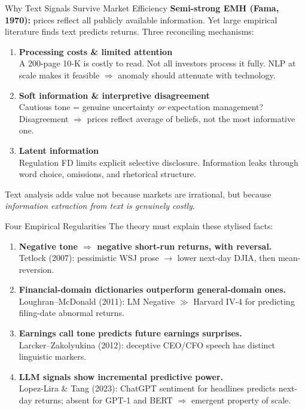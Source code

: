 \documentclass[9pt,t]{beamer}
\begin{document}
\begin{frame}{Why Text Signals Survive Market Efficiency}
  \textbf{Semi-strong EMH (Fama, 1970):} prices reflect all publicly available information.
  Yet large empirical literature finds text predicts returns. Three reconciling mechanisms:
  \medskip
  \begin{enumerate}
    \item \textbf{Processing costs \& limited attention}\\
          {\small A 200-page 10-K is costly to read. Not all investors process it fully.
          NLP at scale makes it feasible $\Rightarrow$ anomaly should attenuate with technology.}
    \medskip
    \item \textbf{Soft information \& interpretive disagreement}\\
          {\small Cautious tone = genuine uncertainty \emph{or} expectation management?
          Disagreement $\Rightarrow$ prices reflect average of beliefs, not the most informative one.}
    \medskip
    \item \textbf{Latent information}\\
          {\small Regulation FD limits explicit selective disclosure.
          Information leaks through word choice, omissions, and rhetorical structure.}
  \end{enumerate}
  \medskip
  \begin{bigpicture}
    Text analysis adds value not because markets are irrational, but because
    \emph{information extraction from text is genuinely costly}.
  \end{bigpicture}
\end{frame}

\begin{frame}{Four Empirical Regularities}
  The theory must explain these stylised facts:
  \medskip
  \begin{enumerate}
    \item \textbf{Negative tone $\Rightarrow$ negative short-run returns, with reversal.}\\
          {\small Tetlock (2007): pessimistic WSJ prose $\to$ lower next-day DJIA, then mean-reversion.}
    \medskip
    \item \textbf{Financial-domain dictionaries outperform general-domain ones.}\\
          {\small Loughran--McDonald (2011): LM Negative $\gg$ Harvard IV-4 for predicting filing-date abnormal returns.}
    \medskip
    \item \textbf{Earnings call tone predicts future earnings surprises.}\\
          {\small Larcker--Zakolyukina (2012): deceptive CEO/CFO speech has distinct linguistic markers.}
    \medskip
    \item \textbf{LLM signals show incremental predictive power.}\\
          {\small Lopez-Lira \& Tang (2023): ChatGPT sentiment for headlines predicts next-day returns;
          absent for GPT-1 and BERT $\Rightarrow$ emergent property of scale.}
  \end{enumerate}
\end{frame}
\end{document}
